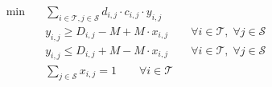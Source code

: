 \begin{align}
  \min\quad & \sum_{i \in \mathcal{T}, j \in \mathcal{S}} d_{i,j} \cdot c_{i,j} \cdot y_{i,j} \tag{total_delay} \\
  & y_{i,j} \ge D_{i,j} - M + M \cdot x_{i,j} \qquad \forall i \in \mathcal{T},\; \forall j \in \mathcal{S} \tag{delay_calc_lower} \\
  & y_{i,j} \le D_{i,j} + M - M \cdot x_{i,j} \qquad \forall i \in \mathcal{T},\; \forall j \in \mathcal{S} \tag{delay_calc_upper} \\
  & \sum_{j \in \mathcal{S}} x_{i,j} = 1 \qquad \forall i \in \mathcal{T} \tag{reschedule} \\
\end{align}